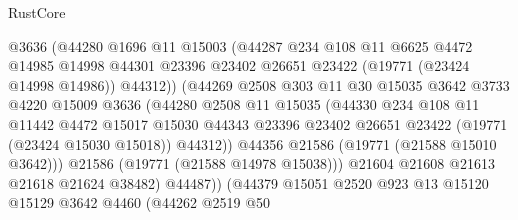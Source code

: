 \begin{lexlean}{RustCore}
\begin{coremodule}
                          @3636
                          (@44280
                            @1696
                            @11
                            @15003
                            (@44287
                              @234
                              @108
                              @11
                              @6625
                              @4472
                              @14985
                              @14998
                              @44301
                              @23396
                              @23402
                              @26651
                              @23422
                              (@19771 (@23424 @14998 @14986))
                              @44312))
                          (@44269
                            @2508
                            @303
                            @11
                            @30
                            @15035
                            @3642
                            @3733
                            @4220
                            @15009
                            @3636
                            (@44280
                              @2508
                              @11
                              @15035
                              (@44330
                                @234
                                @108
                                @11
                                @11442
                                @4472
                                @15017
                                @15030
                                @44343
                                @23396
                                @23402
                                @26651
                                @23422
                                (@19771 (@23424 @15030 @15018))
                                @44312))
                            @44356
                            @21586
                            (@19771 (@21588 @15010 @3642)))
                          @21586
                          (@19771 (@21588 @14978 @15038)))
                        @21604
                        @21608
                        @21613
                        @21618
                        @21624
                        @38482)
                      @44487))
                  (@44379
                    @15051
                    @2520
                    @923
                    @13
                    @15120
                    @15129
                    @3642
                    @4460
                    (@44262
                      @2519
                      @50

\end{coremodule}
\end{lexlean}
